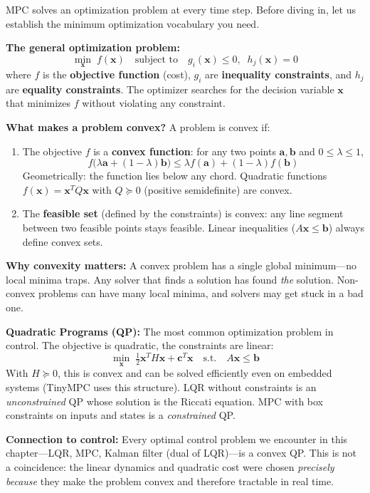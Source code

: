 MPC solves an optimization problem at every time step. Before diving in, let us establish the minimum optimization vocabulary you need.

\textbf{The general optimization problem:}
\[
\min_{\mathbf{x}} \; f(\mathbf{x}) \quad \text{subject to} \quad g_i(\mathbf{x}) \leq 0, \;\; h_j(\mathbf{x}) = 0
\]
where $f$ is the \textbf{objective function} (cost), $g_i$ are \textbf{inequality constraints}, and $h_j$ are \textbf{equality constraints}. The optimizer searches for the decision variable $\mathbf{x}$ that minimizes $f$ without violating any constraint.

\textbf{What makes a problem convex?} A problem is convex if:
\begin{enumerate}[nosep]
    \item The objective $f$ is a \textbf{convex function}: for any two points $\mathbf{a}, \mathbf{b}$ and $0 \leq \lambda \leq 1$,
    \[
    f\bigl(\lambda \mathbf{a} + (1-\lambda)\mathbf{b}\bigr) \leq \lambda f(\mathbf{a}) + (1-\lambda) f(\mathbf{b})
    \]
    Geometrically: the function lies below any chord. Quadratic functions $f(\mathbf{x}) = \mathbf{x}^T Q \mathbf{x}$ with $Q \succeq 0$ (positive semidefinite) are convex.
    \item The \textbf{feasible set} (defined by the constraints) is convex: any line segment between two feasible points stays feasible. Linear inequalities ($A\mathbf{x} \leq \mathbf{b}$) always define convex sets.
\end{enumerate}

\textbf{Why convexity matters:} A convex problem has a single global minimum---no local minima traps. Any solver that finds a solution has found \textit{the} solution. Non-convex problems can have many local minima, and solvers may get stuck in a bad one.

\textbf{Quadratic Programs (QP):} The most common optimization problem in control. The objective is quadratic, the constraints are linear:
\[
\min_{\mathbf{x}} \; \tfrac{1}{2}\mathbf{x}^T H \mathbf{x} + \mathbf{c}^T \mathbf{x} \quad \text{s.t.} \quad A\mathbf{x} \leq \mathbf{b}
\]
With $H \succeq 0$, this is convex and can be solved efficiently even on embedded systems (TinyMPC uses this structure). LQR without constraints is an \textit{unconstrained} QP whose solution is the Riccati equation. MPC with box constraints on inputs and states is a \textit{constrained} QP.

\textbf{Connection to control:} Every optimal control problem we encounter in this chapter---LQR, MPC, Kalman filter (dual of LQR)---is a convex QP. This is not a coincidence: the linear dynamics and quadratic cost were chosen \textit{precisely because} they make the problem convex and therefore tractable in real time.

